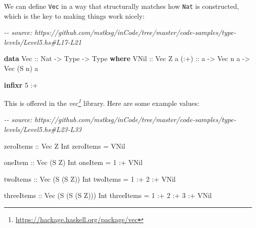 \documentclass[]{article}
\newenvironment{Shaded}{}{}
\newcommand{\CommentTok}[1]{\textcolor[rgb]{0.38,0.63,0.69}{\textit{#1}}}
\newcommand{\DataTypeTok}[1]{\textcolor[rgb]{0.56,0.13,0.00}{#1}}
\newcommand{\DecValTok}[1]{\textcolor[rgb]{0.25,0.63,0.44}{#1}}
\newcommand{\KeywordTok}[1]{\textcolor[rgb]{0.00,0.44,0.13}{\textbf{#1}}}
\newcommand{\NormalTok}[1]{#1}
\newcommand{\OperatorTok}[1]{\textcolor[rgb]{0.40,0.40,0.40}{#1}}
\newcommand{\OtherTok}[1]{\textcolor[rgb]{0.00,0.44,0.13}{#1}}
\renewcommand{\href}[2]{#2\footnote{\url{#1}}}
\begin{document}
We can define \texttt{Vec} in a way that structurally matches how \texttt{Nat}
is constructed, which is the key to making things work nicely:

\begin{Shaded}
\begin{Highlighting}[]
\CommentTok{{-}{-} source: https://github.com/mstksg/inCode/tree/master/code{-}samples/type{-}levels/Level5.hs\#L17{-}L21}

\KeywordTok{data} \DataTypeTok{Vec}\OtherTok{ ::} \DataTypeTok{Nat} \OtherTok{{-}\textgreater{}} \DataTypeTok{Type} \OtherTok{{-}\textgreater{}} \DataTypeTok{Type} \KeywordTok{where}
  \DataTypeTok{VNil}\OtherTok{ ::} \DataTypeTok{Vec} \DataTypeTok{Z}\NormalTok{ a}
\OtherTok{  (:+) ::}\NormalTok{ a }\OtherTok{{-}\textgreater{}} \DataTypeTok{Vec}\NormalTok{ n a }\OtherTok{{-}\textgreater{}} \DataTypeTok{Vec}\NormalTok{ (}\DataTypeTok{S}\NormalTok{ n) a}

\KeywordTok{infixr} \DecValTok{5} \OperatorTok{:+}
\end{Highlighting}
\end{Shaded}

This is offered in the
\emph{\href{https://hackage.haskell.org/package/vec}{vec}} library. Here are
some example values:

\begin{Shaded}
\begin{Highlighting}[]
\CommentTok{{-}{-} source: https://github.com/mstksg/inCode/tree/master/code{-}samples/type{-}levels/Level5.hs\#L23{-}L33}

\OtherTok{zeroItems ::} \DataTypeTok{Vec} \DataTypeTok{Z} \DataTypeTok{Int}
\NormalTok{zeroItems }\OtherTok{=} \DataTypeTok{VNil}

\OtherTok{oneItem ::} \DataTypeTok{Vec}\NormalTok{ (}\DataTypeTok{S} \DataTypeTok{Z}\NormalTok{) }\DataTypeTok{Int}
\NormalTok{oneItem }\OtherTok{=} \DecValTok{1} \OperatorTok{:+} \DataTypeTok{VNil}

\OtherTok{twoItems ::} \DataTypeTok{Vec}\NormalTok{ (}\DataTypeTok{S}\NormalTok{ (}\DataTypeTok{S} \DataTypeTok{Z}\NormalTok{)) }\DataTypeTok{Int}
\NormalTok{twoItems }\OtherTok{=} \DecValTok{1} \OperatorTok{:+} \DecValTok{2} \OperatorTok{:+} \DataTypeTok{VNil}

\OtherTok{threeItems ::} \DataTypeTok{Vec}\NormalTok{ (}\DataTypeTok{S}\NormalTok{ (}\DataTypeTok{S}\NormalTok{ (}\DataTypeTok{S} \DataTypeTok{Z}\NormalTok{))) }\DataTypeTok{Int}
\NormalTok{threeItems }\OtherTok{=} \DecValTok{1} \OperatorTok{:+} \DecValTok{2} \OperatorTok{:+} \DecValTok{3} \OperatorTok{:+} \DataTypeTok{VNil}
\end{Highlighting}
\end{Shaded}
\end{document}
